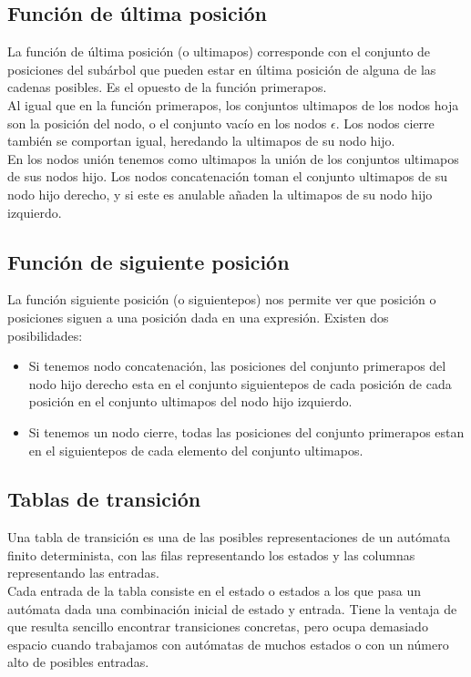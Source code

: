 \subsection{Función de última posición}
La función de última posición (o ultimapos) corresponde con el conjunto de posiciones del subárbol que pueden estar en última posición de alguna de las cadenas posibles.
Es el opuesto de la función primerapos.
\\
Al igual que en la función primerapos, los conjuntos ultimapos de los nodos hoja son la posición del nodo, o el conjunto vacío en los nodos $ \epsilon $.
Los nodos cierre también se comportan igual, heredando la ultimapos de su nodo hijo.
\\
En los nodos unión tenemos como ultimapos la unión de los conjuntos ultimapos de sus nodos hijo.
Los nodos concatenación toman el conjunto ultimapos de su nodo hijo derecho, y si este es anulable añaden la ultimapos de su nodo hijo izquierdo.

\subsection{Función de siguiente posición}
La función siguiente posición (o siguientepos) nos permite ver que posición o posiciones siguen a una posición dada en una expresión.
Existen dos posibilidades:
\begin{itemize}
	\item Si tenemos nodo concatenación, las posiciones del conjunto primerapos del nodo hijo derecho esta en el conjunto siguientepos de cada posición de cada posición en el conjunto ultimapos del nodo hijo izquierdo.
	\item Si tenemos un nodo cierre, todas las posiciones del conjunto primerapos estan en el siguientepos de cada elemento del conjunto ultimapos.
\end{itemize}

\subsection{Tablas de transición}
Una tabla de transición es una de las posibles representaciones de un autómata finito determinista, con las filas representando los estados y las columnas representando las entradas.
\\
Cada entrada de la tabla consiste en el estado o estados a los que pasa un autómata dada una combinación inicial de estado y entrada.
Tiene la ventaja de que resulta sencillo encontrar transiciones concretas, pero ocupa demasiado espacio cuando trabajamos con autómatas de muchos estados o con un número alto de posibles entradas.
